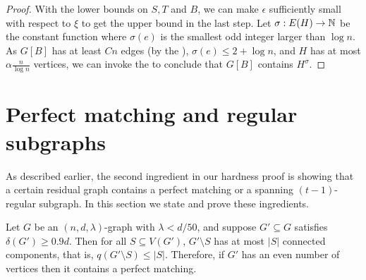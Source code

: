 \documentclass[11pt]{article}
\begin{document}
\begin{proof}
With the lower bounds on $S,T$ and $B$, we can make $\epsilon$ sufficiently small with respect to $\xi$ to get the upper bound in the last step.
    Let $\sigma: E(H) \to \mathbb{N}$ be the constant function where $\sigma(e)$ is the smallest odd integer larger than $\log n$. 
As $G[B]$ has at least $Cn$ edges (by the ), $\sigma(e) \le 2 + \log n$, and $H$ has at most $\alpha \frac{n}{\log n}$ vertices, we can invoke the  to conclude that $G[B]$ contains $H^\sigma$.
\end{proof}

\section{Perfect matching and regular subgraphs}
\label{sec:matching-machinery}
As described earlier, the second ingredient in our hardness proof is showing that a certain residual graph contains a perfect matching or a spanning $(t-1)$-regular subgraph. In this section we state and prove these ingredients.

\begin{lemma}\label{thm:perfect-matching}
Let $G$ be an  $(n, d, \lambda)$-graph with $\lambda < d/50$, and suppose $G' \subseteq G$ satisfies $\delta(G') \ge 0.9d$. Then for all $S \subseteq V(G')$, $G' \setminus S$ has at most $|S|$ connected components, that is, $q(G' \setminus S) \le |S|$. Therefore, if $G'$ has an even number of vertices then it contains a perfect matching.
\end{lemma}
\end{document}
